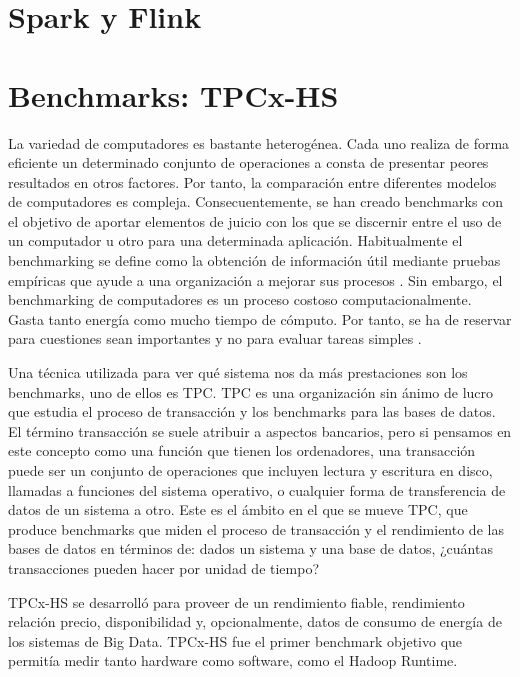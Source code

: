 \documentclass[10pt]{article}
\begin{document}
\section{Spark y Flink} \label{sec:spark-flink}



\section{Benchmarks: TPCx-HS} \label{sec:tpcx-hs}


	La variedad de computadores es bastante heterogénea. Cada uno realiza de forma eficiente un determinado conjunto de operaciones a consta de presentar peores resultados en otros factores. Por tanto, la comparación entre diferentes modelos de computadores es compleja. Consecuentemente, se han creado benchmarks con el objetivo de aportar elementos de juicio con los que se discernir entre el uso de un computador u otro para una determinada aplicación. Habitualmente el benchmarking se define como la obtención de información útil mediante pruebas empíricas que ayude a una organización a mejorar sus procesos \cite{benchmarking}. Sin embargo, el benchmarking de computadores es un proceso costoso computacionalmente. Gasta tanto energía como mucho tiempo de cómputo. Por tanto, se ha de reservar para cuestiones sean importantes y no para evaluar tareas simples \cite{desv-bench}.

	Una técnica utilizada para ver qué sistema nos da más prestaciones son los benchmarks, uno de ellos es TPC. TPC es una organización sin ánimo de lucro que estudia el proceso de transacción y los benchmarks para las bases de datos. El término transacción se suele atribuir a aspectos bancarios, pero si pensamos en este concepto como una función que tienen los ordenadores, una transacción puede ser un conjunto de operaciones que incluyen lectura y escritura en disco, llamadas a funciones del sistema operativo, o cualquier forma de transferencia de datos de un sistema a otro. Este es el ámbito en el que se mueve TPC, que produce benchmarks que miden el proceso de transacción y el rendimiento de las bases de datos en términos de: dados un sistema y una base de datos, ¿cuántas transacciones pueden hacer por unidad de tiempo?\cite{intro-tpc}
	
	TPCx-HS se desarrolló para proveer de un rendimiento fiable, rendimiento relación precio, disponibilidad y, opcionalmente, datos de consumo de energía de los sistemas de Big Data. TPCx-HS fue el primer benchmark objetivo que permitía medir tanto hardware como software, como el Hadoop Runtime. \cite{info-tpc}
	
\end{document}
